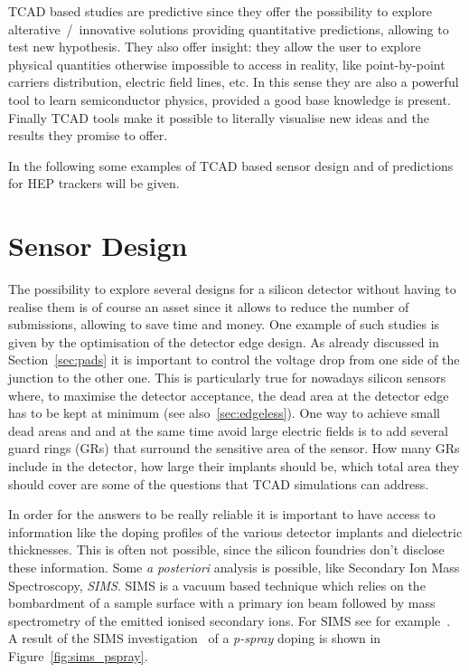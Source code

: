 TCAD based studies are predictive since they offer the possibility to explore alterative~/~innovative 
solutions providing quantitative predictions, allowing to test new hypothesis. 
They also offer insight: they allow the user to explore physical quantities otherwise impossible to 
access in reality, like point-by-point carriers distribution, electric field lines, etc. In this sense they 
are also a powerful tool to learn semiconductor physics, provided a good base knowledge is present.
Finally TCAD tools make it possible to literally visualise new ideas and the results they promise to 
offer.

In the following some examples of TCAD based sensor design and of predictions for HEP
trackers will be given.

\section{Sensor Design}
\label{sec:sensordesign}

The possibility to explore several designs for a silicon detector without having to realise them is 
of course an asset since it allows to reduce the number of submissions, allowing to save time 
and money. 
One example of such studies is given by the optimisation of the detector edge design. 
As already discussed in Section~\ref{sec:pads} it is important to control the voltage 
drop from one side of the junction to the other one. This is particularly true for nowadays 
silicon sensors where, to maximise the detector acceptance, the dead area at the 
detector edge has to be kept at minimum (see also~\ref{sec:edgeless}). One way to achieve 
small dead areas and and at the same time avoid large electric fields is to add several 
guard rings (GRs) that surround the sensitive area of the sensor. How many GRs include in 
the detector, how large their implants should be, which total area they should cover are 
some of the questions that TCAD simulations can address. 

In order for the answers to be really reliable it is important to have access to information 
like the doping profiles of the various detector implants and dielectric thicknesses. 
This is often not possible, since 
the silicon foundries don't disclose these information. Some {\it a posteriori} analysis is possible, 
like Secondary Ion Mass Spectroscopy, {\it SIMS}. SIMS is a vacuum based technique 
which relies on the bombardment of a sample surface with a primary ion 
beam  followed  by  mass  spectrometry  of  the 
 emitted  ionised  secondary  ions.  For SIMS see for example~\cite{dinu:tel-00872318}.
A result of the SIMS investigation~\cite{SIMS} of a {\it p-spray} doping is shown in Figure~\ref{fig:sims_pspray}. 

